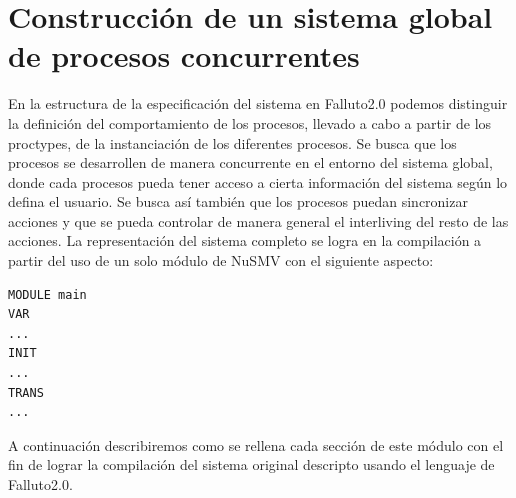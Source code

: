 \documentclass[titlepage, 12pt]{book}
\begin{document}
\section{Construcción de un sistema global de procesos concurrentes}
En la estructura de la especificación del sistema en Falluto2.0 podemos distinguir la definición del comportamiento de los procesos, llevado a cabo a partir de los proctypes, de la instanciación de los diferentes procesos. Se busca que los procesos se desarrollen de manera concurrente en el entorno del sistema global, donde cada procesos pueda tener acceso a cierta información del sistema según lo defina el usuario. Se busca así también que los procesos puedan sincronizar acciones y que se pueda controlar de manera general el interliving del resto de las acciones.
La representación del sistema completo se logra en la compilación a partir del uso de un solo módulo de NuSMV con el siguiente aspecto:
\begin{verbatim}
MODULE main
VAR
...
INIT
...
TRANS
...
\end{verbatim}
A continuación describiremos como se rellena cada sección de este módulo con el fin de lograr la compilación del sistema original descripto usando el lenguaje de Falluto2.0.\\
\end{document}
